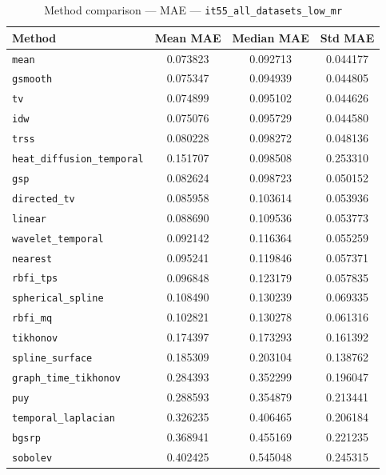 \begin{table}[ht]
\centering
\caption{Method comparison — MAE — \texttt{it55_all_datasets_low_mr}}
\label{tab:mae_it55_all_datasets_low_mr}
\begin{tabular}{lccc}
\hline
Method & Mean MAE & Median MAE & Std MAE \\
\hline
\texttt{mean} & 0.073823 & 0.092713 & 0.044177 \\
\texttt{gsmooth} & 0.075347 & 0.094939 & 0.044805 \\
\texttt{tv} & 0.074899 & 0.095102 & 0.044626 \\
\texttt{idw} & 0.075076 & 0.095729 & 0.044580 \\
\texttt{trss} & 0.080228 & 0.098272 & 0.048136 \\
\texttt{heat_diffusion_temporal} & 0.151707 & 0.098508 & 0.253310 \\
\texttt{gsp} & 0.082624 & 0.098723 & 0.050152 \\
\texttt{directed_tv} & 0.085958 & 0.103614 & 0.053936 \\
\texttt{linear} & 0.088690 & 0.109536 & 0.053773 \\
\texttt{wavelet_temporal} & 0.092142 & 0.116364 & 0.055259 \\
\texttt{nearest} & 0.095241 & 0.119846 & 0.057371 \\
\texttt{rbfi_tps} & 0.096848 & 0.123179 & 0.057835 \\
\texttt{spherical_spline} & 0.108490 & 0.130239 & 0.069335 \\
\texttt{rbfi_mq} & 0.102821 & 0.130278 & 0.061316 \\
\texttt{tikhonov} & 0.174397 & 0.173293 & 0.161392 \\
\texttt{spline_surface} & 0.185309 & 0.203104 & 0.138762 \\
\texttt{graph_time_tikhonov} & 0.284393 & 0.352299 & 0.196047 \\
\texttt{puy} & 0.288593 & 0.354879 & 0.213441 \\
\texttt{temporal_laplacian} & 0.326235 & 0.406465 & 0.206184 \\
\texttt{bgsrp} & 0.368941 & 0.455169 & 0.221235 \\
\texttt{sobolev} & 0.402425 & 0.545048 & 0.245315 \\
\hline
\end{tabular}
\end{table}
